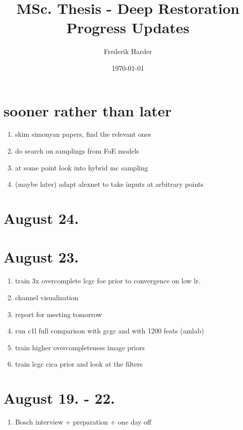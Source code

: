 \documentclass{article}
\title{MSc. Thesis - Deep Restoration\\Progress Updates}
\date{\today}
\author{Frederik Harder}
\begin{document}
\maketitle

\section*{sooner rather than later}

\begin{enumerate}
	\item skim simonyan papers, find the relevant ones
	\item do search on samplings from FoE models
	\item at some point look into hybrid mc sampling
	\item (maybe later) adapt alexnet to take inputs at arbitrary points
\end{enumerate}

\section{August 24.}


\section{August 23.}

\begin{enumerate}
	\item train 3x overcomplete lcgc foe prior to convergence on low lr.
	\item channel visualization
	\item report for meeting tomorrow
	\item run c1l full comparison with gcgc and with 1200 feats (amlab)
	\item train higher overcompleteness image priors
	\item train lcgc cica prior and look at the filters
\end{enumerate}

\section{August 19. - 22.}

\begin{enumerate}
	\item Bosch interview + preparation + one day off
\end{enumerate}
\end{document}
